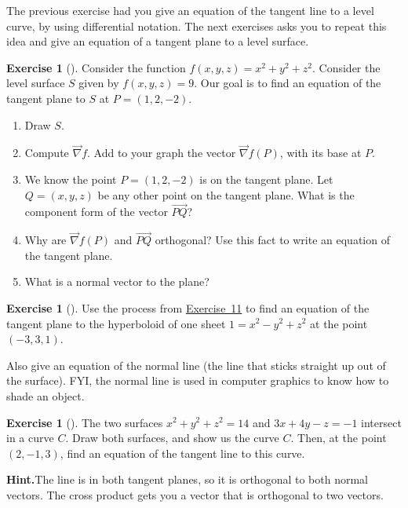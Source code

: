 \documentclass[10pt,]{book}
\theoremstyle{plain}
\theoremstyle{definition}
\theoremstyle{definition}
\theoremstyle{definition}
\theoremstyle{definition}
\newtheorem{exploration}[project]{Exercise}
\theoremstyle{definition}
\numberwithin{equation}{section}
\begin{document}
The previous exercise had you give an equation of the tangent line to a level curve, by using differential notation. The next exercises asks you to repeat this idea and give an equation of a tangent plane to a level surface.%
\begin{exploration}[]\label{prob_gradient_to_tangent_practice}
Consider the function \(f(x,y,z)=x^2+y^2+z^2\). Consider the level surface \(S\) given by \(f(x,y,z)=9\). Our goal is to find an equation of the tangent plane to \(S\) at \(P=(1,2,-2)\).%
\begin{enumerate}[font=\bfseries,label=(\alph*),ref=\alph*]
\item\label{task-633} Draw \(S\).%
\item\label{task-634} Compute \(\vec \nabla f\). Add to your graph the vector \(\vec \nabla f(P)\), with its base at \(P\).%
\item\label{task-635} We know the point \(P=(1,2,-2)\) is on the tangent plane. Let \(Q=(x,y,z)\) be any other point on the tangent plane.  What is the component form of the vector \(\vec {PQ}\)?%
\item\label{task-636} Why are  \(\vec \nabla f(P)\) and \(\vec{PQ}\) orthogonal? Use this fact to write an equation of the tangent plane.%
\item\label{task-637} What is a normal vector to the plane?%
\end{enumerate}
\end{exploration}
\begin{exploration}[]\label{exploration-232}
Use the process from \hyperref[prob_gradient_to_tangent_practice]{Exercise~11} to find an equation of the tangent plane to the hyperboloid of one sheet \(1=x^2-y^2+z^2\) at the point \((-3,3,1)\).%
\par
Also give an equation of the normal line (the line that sticks straight up out of the surface). FYI, the normal line is used in computer graphics to know how to shade an object.%
\end{exploration}
\begin{exploration}[]\label{exploration-233}
The two surfaces \(x^2+y^2+z^2=14\) and \(3x+4y-z=-1\) intersect in a curve \(C\). Draw both surfaces, and show us the curve \(C\). Then, at the point \((2,-1,3)\), find an equation of the tangent line to this curve.%
\par\medskip\noindent%
\textbf{Hint.}\quad The line is in both tangent planes, so it is orthogonal to both normal vectors. The cross product gets you a vector that is orthogonal to two vectors.%
\end{exploration}
\typeout{************************************************}
\typeout{************************************************}
\end{document}
